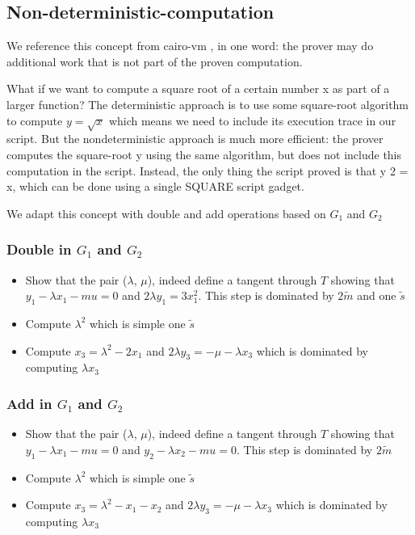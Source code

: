 \subsection{Non-deterministic-computation}

We reference this concept from cairo-vm \cite{website:cairo-vm}, in one word: the prover
may do additional work that is not part of the proven computation.

What if we want to compute a square root of a certain
number x as part of a larger function? The deterministic approach is to use
some square-root algorithm to compute $ y = \sqrt{x} $ which means we need to
include its execution trace in our script. But the nondeterministic approach
is much more efficient: the prover computes the square-root y using the
same algorithm, but does not include this computation in the script. Instead, the only thing the script proved is that y
2 = x, which can be done using a single SQUARE script gadget.

We adapt this concept with double and add operations based on $G_1$ and $G_2$

\subsubsection{Double in $G_1$ and $G_2$}

\begin{itemize}
    \item Show that the pair ($\lambda$, $\mu$), indeed define a tangent through $T$ showing that $\displaystyle y_1 - \lambda x_{1} - mu = 0$ 
    and $\displaystyle 2\lambda y_1 = 3x_1^2$. This step is dominated by $2\tilde{m}$ and one $\tilde{s}$
    \item Compute $\lambda^2$ which is simple one $\tilde{s}$
    \item Compute $\displaystyle x_3 = \lambda^2-2x_1$ and $\displaystyle 2\lambda y_3 = -\mu - \lambda x_3$ which is dominated by computing $\lambda x_3$
\end{itemize}

\subsubsection{Add in $G_1$ and $G_2$}

\begin{itemize}
    \item Show that the pair ($\lambda$, $\mu$), indeed define a tangent through $T$ showing that $\displaystyle y_1 - \lambda x_{1} - mu = 0$ 
    and $\displaystyle y_2 - \lambda x_{2} - mu = 0$. This step is dominated by $2\tilde{m}$
    \item Compute $\lambda^2$ which is simple one $\tilde{s}$
    \item Compute $\displaystyle x_3 = \lambda^2-x_1-x_2$ and $\displaystyle 2\lambda y_3 = -\mu - \lambda x_3$ which is dominated by computing $\lambda x_3$
\end{itemize}
